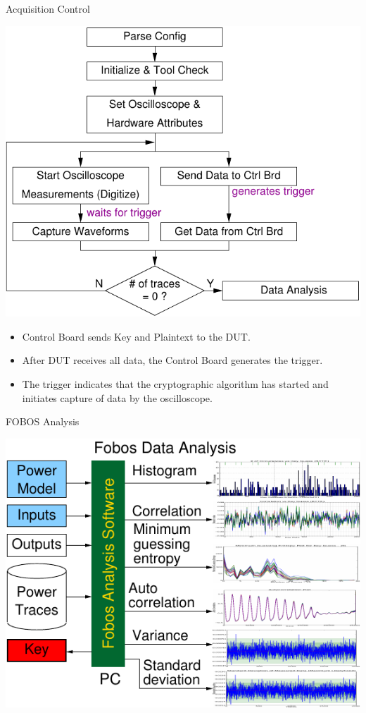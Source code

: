 \documentclass[xcolor=pdftex,dvipsnames,table,final]{beamer}
\begin{document}
\begin{frame}[fragile]{}
\begin{columns}[t]
\begin{column}{.31\linewidth}
      \begin{block}{Acquisition Control}
        \begin{center}
          \includegraphics[scale=1.5]{../figures/data_acq}
        \end{center} 
        \begin{itemize}
          \item Control Board sends Key and Plaintext to the DUT.
          \item After DUT receives all data, the Control Board generates the trigger.
          \item The trigger indicates that the cryptographic algorithm has started
                and initiates capture of data by the oscilloscope.
        \end{itemize}
       \end{block}
       \begin{block}{FOBOS Analysis}
        \begin{minipage}{0.69\linewidth}
		\includegraphics[scale=1.5]{../figures/fobos-dan}

\end{minipage}
\end{block}
\end{column}
\end{columns}
\end{frame}
\end{document}
